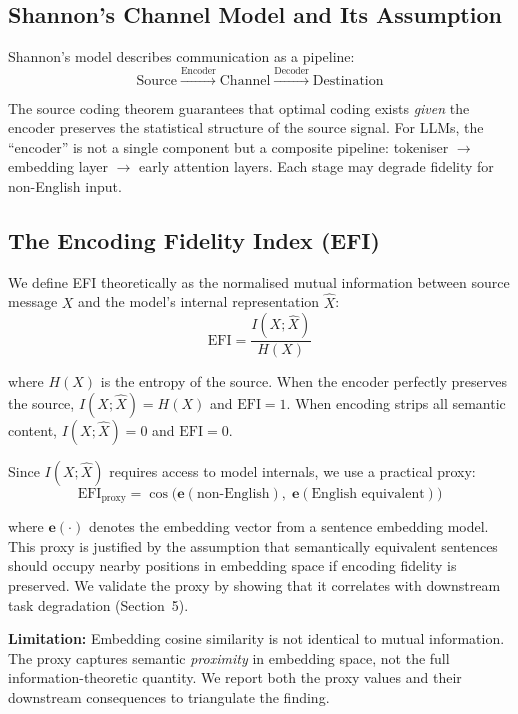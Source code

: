 \documentclass[11pt,a4paper]{article}
\begin{document}
\subsection{Shannon's Channel Model and Its Assumption}

Shannon's model describes communication as a pipeline:
\begin{equation}
    \text{Source} \xrightarrow{\text{Encoder}} \text{Channel} \xrightarrow{\text{Decoder}} \text{Destination}
\end{equation}

The source coding theorem guarantees that optimal coding exists \emph{given} the encoder preserves the statistical structure of the source signal. For LLMs, the ``encoder'' is not a single component but a composite pipeline: tokeniser $\to$ embedding layer $\to$ early attention layers. Each stage may degrade fidelity for non-English input.

\subsection{The Encoding Fidelity Index (EFI)}

We define EFI theoretically as the normalised mutual information between source message $X$ and the model's internal representation $\hat{X}$:
\begin{equation}
    \text{EFI} = \frac{I(X; \hat{X})}{H(X)}
\end{equation}

where $H(X)$ is the entropy of the source. When the encoder perfectly preserves the source, $I(X; \hat{X}) = H(X)$ and $\text{EFI} = 1$. When encoding strips all semantic content, $I(X; \hat{X}) = 0$ and $\text{EFI} = 0$.

Since $I(X; \hat{X})$ requires access to model internals, we use a practical proxy:
\begin{equation}
    \text{EFI}_{\text{proxy}} = \cos\!\big(\mathbf{e}(\text{non-English}),\; \mathbf{e}(\text{English equivalent})\big)
\end{equation}

where $\mathbf{e}(\cdot)$ denotes the embedding vector from a sentence embedding model. This proxy is justified by the assumption that semantically equivalent sentences should occupy nearby positions in embedding space if encoding fidelity is preserved. We validate the proxy by showing that it correlates with downstream task degradation (Section~5).

\textbf{Limitation:} Embedding cosine similarity is not identical to mutual information. The proxy captures semantic \emph{proximity} in embedding space, not the full information-theoretic quantity. We report both the proxy values and their downstream consequences to triangulate the finding.
\end{document}
